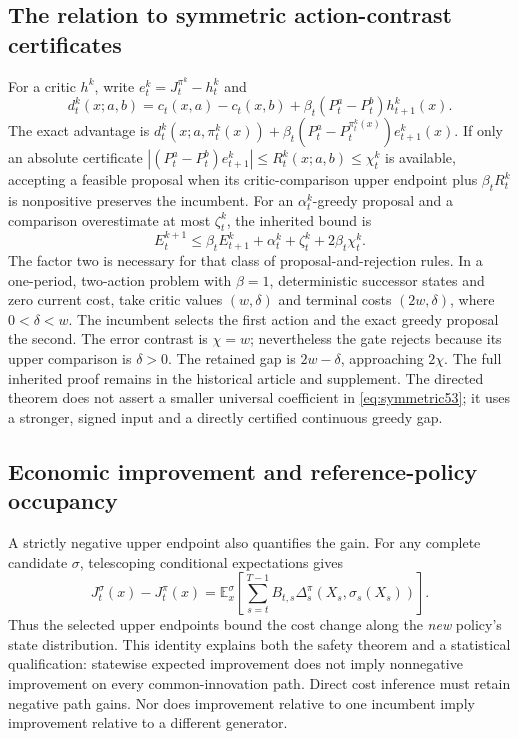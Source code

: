 \subsection{The relation to symmetric action-contrast certificates}
For a critic $h^k$, write $e_t^k=J_t^{\pi^k}-h_t^k$ and
\[
 d_t^k(x;a,b)=c_t(x,a)-c_t(x,b)+\beta_t(P_t^a-P_t^b)h_{t+1}^k(x).
\]
The exact advantage is $d_t^k(x;a,\pi_t^k(x))+\beta_t(P_t^a-P_t^{\pi_t^k(x)})e_{t+1}^k(x)$. If only an absolute certificate $|(P_t^a-P_t^b)e_{t+1}^k|\le R_t^k(x;a,b)\le\chi_t^k$ is available, accepting a feasible proposal when its critic-comparison upper endpoint plus $\beta_tR_t^k$ is nonpositive preserves the incumbent. For an $\alpha_t^k$-greedy proposal and a comparison overestimate at most $\zeta_t^k$, the inherited bound is
\begin{equation}\label{eq:symmetric53}
 E_t^{k+1}\le\beta_tE_{t+1}^k+\alpha_t^k+\zeta_t^k+2\beta_t\chi_t^k.
\end{equation}
The factor two is necessary for that class of proposal-and-rejection rules. In a one-period, two-action problem with $\beta=1$, deterministic successor states and zero current cost, take critic values $(w,\delta)$ and terminal costs $(2w,\delta)$, where $0<\delta<w$. The incumbent selects the first action and the exact greedy proposal the second. The error contrast is $\chi=w$; nevertheless the gate rejects because its upper comparison is $\delta>0$. The retained gap is $2w-\delta$, approaching $2\chi$. The full inherited proof remains in the historical article and supplement. The directed theorem does not assert a smaller universal coefficient in \eqref{eq:symmetric53}; it uses a stronger, signed input and a directly certified continuous greedy gap.

\subsection{Economic improvement and reference-policy occupancy}
A strictly negative upper endpoint also quantifies the gain. For any complete candidate $\sigma$, telescoping conditional expectations gives
\begin{equation}\label{eq:performance53}
 J_t^\sigma(x)-J_t^\pi(x)=
 \mathbb E_x^\sigma\!\left[\sum_{s=t}^{T-1}B_{t,s}
       \Delta_s^\pi(X_s,\sigma_s(X_s))\right].
\end{equation}
Thus the selected upper endpoints bound the cost change along the \emph{new} policy's state distribution. This identity explains both the safety theorem and a statistical qualification: statewise expected improvement does not imply nonnegative improvement on every common-innovation path. Direct cost inference must retain negative path gains. Nor does improvement relative to one incumbent imply improvement relative to a different generator.

